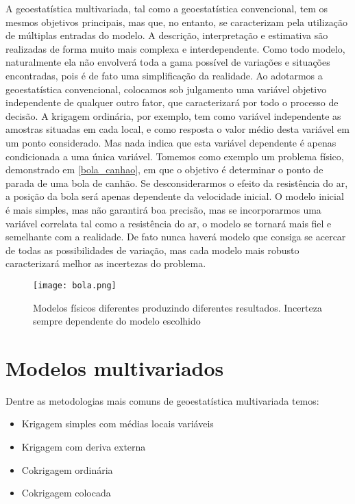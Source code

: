 A geoestatística multivariada, tal como a geoestatística convencional, tem os mesmos objetivos principais, mas que, no entanto, se caracterizam pela utilização de múltiplas entradas do modelo. A descrição, interpretação e estimativa são realizadas de forma muito mais complexa e interdependente.  
Como todo modelo, naturalmente ela não envolverá toda a gama possível de variações e situações encontradas, pois é de fato uma simplificação da realidade. Ao adotarmos a geoestatística convencional, colocamos sob julgamento uma variável objetivo independente de qualquer outro fator,  que caracterizará por todo o processo de decisão.  A krigagem ordinária, por exemplo, tem como variável independente as amostras situadas em cada local, e como resposta o valor médio desta variável em um ponto considerado. Mas nada indica que esta variável dependente é apenas condicionada a uma única variável.  Tomemos como exemplo um problema físico, demonstrado em \eqref{bola_canhao}, em que o objetivo é determinar o ponto de parada de uma bola de canhão. Se desconsiderarmos o efeito da resistência do ar, a posição da bola será apenas dependente da velocidade inicial. O modelo inicial é mais simples, mas não garantirá boa precisão, mas se incorporarmos uma variável correlata tal como a resistência do ar, o modelo se tornará mais fiel e semelhante com a realidade. De fato nunca haverá modelo que consiga se acercar de todas as possibilidades de variação, mas cada modelo mais robusto caracterizará melhor as incertezas do problema. 
 
\begin{figure}[H]
	\centering
	\texttt{[image: bola.png]}	
	\caption{Modelos físicos diferentes produzindo diferentes resultados. Incerteza sempre dependente do modelo escolhido}
	\label{bola_canhao}
\end{figure}

\section{Modelos multivariados}

Dentre as metodologias mais comuns de geoestatística multivariada temos:

\begin{itemize}
	\item Krigagem simples com médias locais variáveis 
	\item Krigagem com deriva externa 
	\item Cokrigagem ordinária 
	\item Cokrigagem colocada
\end{itemize}


